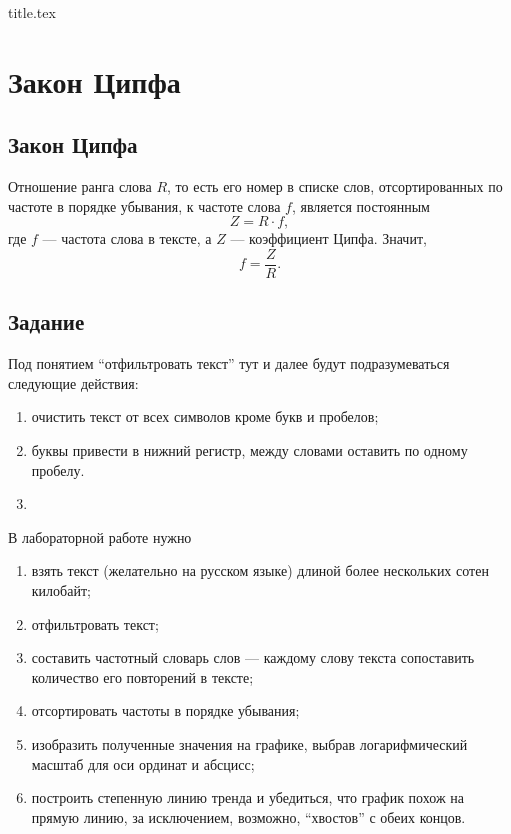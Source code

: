 



{title.tex}

\clearpage
\setcounter{page}{2}

\tableofcontents
\thispagestyle{empty}

\clearpage
\pagestyle{fancy}

\clearpage

\chapter{Закон Ципфа}

\section{Закон Ципфа}
Отношение ранга слова $R$, то есть его номер в списке слов,
отсортированных по частоте в порядке убывания, к частоте слова $f$,
является постоянным \cite{JeanBaptiste}
\begin{equation*}
  Z = R \cdot f,
\end{equation*}
где $f$ --- частота слова в тексте, а $Z$ --- коэффициент Ципфа.
Значит,
\begin{equation*}
  f = \frac{Z}{R}.
\end{equation*}

\section{Задание}

Под понятием ``отфильтровать текст'' тут и далее будут подразумеваться
следующие действия:
\begin{enumerate}
  \item
    очистить текст от всех символов кроме букв и пробелов;
  \item
    буквы привести в нижний регистр, между словами оставить по одному пробелу.
  \item
\end{enumerate}

В лабораторной работе нужно
\begin{enumerate}
  \item
    взять текст (желательно на русском языке)
    длиной более нескольких сотен килобайт;
  \item
    отфильтровать текст;
  \item
    составить частотный словарь слов --- каждому слову текста
    сопоставить количество его повторений в тексте;
  \item
    отсортировать частоты в порядке убывания;
  \item
    изобразить полученные значения на графике,
    выбрав логарифмический масштаб для оси ординат и абсцисс;
  \item
    построить степенную линию тренда и убедиться,
    что график похож на прямую линию, за исключением, возможно,
    ``хвостов'' с обеих концов.
\end{enumerate}

